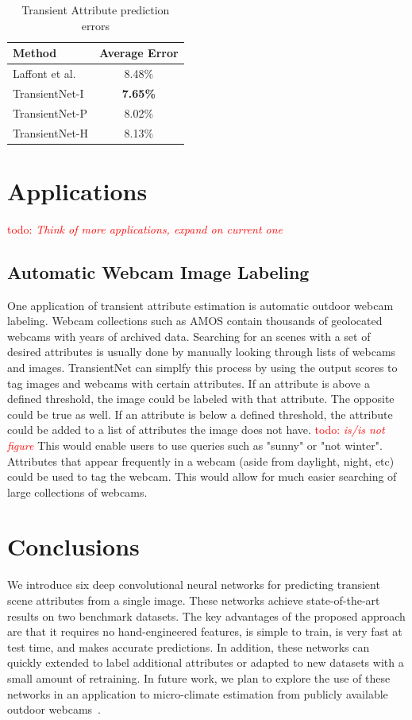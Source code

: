 \documentclass{article}
\newcommand{\todo}[1]{\textcolor{red}{todo: {\em #1}}}
\begin{document}
\begin{table}[t]
	\centering
	\begin{tabular}{ | l | c | }
		\hline
			Method & Average Error \\ \hline
			Laffont et al.~\cite{Laffont14}& 8.48\% \\ \hline
			TransientNet-I & \textbf{7.65\%} \\ \hline
			TransientNet-P & 8.02\% \\ \hline
			TransientNet-H & 8.13\% \\ 
		\hline
	\end{tabular}
	\caption{Transient Attribute prediction errors}
	\label{tbl:transient}
\end{table}

\section{Applications}
\todo{Think of more applications, expand on current one}
\subsection{Automatic Webcam Image Labeling}
\indent

One application of transient attribute estimation is automatic outdoor
webcam labeling. Webcam collections such as AMOS\cite{jacobs07amos} contain
thousands of geolocated webcams with years of archived data.  Searching
for an scenes with a set of desired attributes is usually done by manually
looking through lists of webcams and images.  TransientNet can simplfy this
process by using the output scores to tag images and webcams with certain 
attributes.  If an attribute is above a defined threshold, the image could 
be labeled with that attribute.  The opposite could be true as well.  If an
attribute is below a defined threshold, the attribute could be added to a 
list of attributes the image does not have.  \todo{is/is not figure} This 
would enable users to use queries such as "sunny" or "not winter".  
Attributes that appear frequently in a webcam (aside from daylight, night, etc)
could be used to tag the webcam.  This would allow for much easier searching 
of large collections of webcams.


\section{Conclusions}

We introduce six deep convolutional neural networks for predicting
transient scene attributes from a single image. These networks achieve
state-of-the-art results on two benchmark datasets. The key advantages
of the proposed approach are that it requires no hand-engineered
features, is simple to train, is very fast at test time, and makes
accurate predictions. In addition, these networks can quickly extended
to label additional attributes or adapted to new datasets with a small
amount of retraining. In future work, we plan to explore the use of
these networks in an application to micro-climate estimation from
publicly available outdoor webcams~\cite{islam13webcamweather}. 



\end{document}
